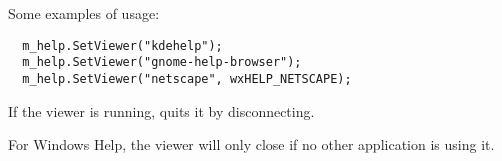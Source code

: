 Some examples of usage:

\begin{verbatim}
  m_help.SetViewer("kdehelp");
  m_help.SetViewer("gnome-help-browser");
  m_help.SetViewer("netscape", wxHELP_NETSCAPE);
\end{verbatim}

\label{wxhelpcontrollerquit}


If the viewer is running, quits it by disconnecting.

For Windows Help, the viewer will only close if no other application is using it.

